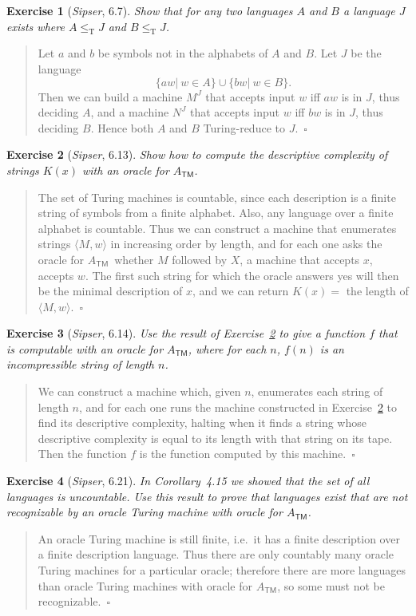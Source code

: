 \documentclass{article}
\theoremstyle{break}			%
\newtheorem{exercise}{Exercise}
\theoremstyle{plain}
\newenvironment{answer}{\begin{quotation}\noindent}{\end{quotation}}
\newcommand{\sipser}{\textit{Sipser}}
\newcommand{\encoding}[1]{\ensuremath{\langle#1\rangle}}
\newcommand{\qed}{~\ensuremath{\square}}
\newcommand{\tred}{\ensuremath{\leq_{\text{T}}}}
\newcommand{\ATM}{\ensuremath{A_{\textsf{TM}}}}
\newcommand{\set}[1]{\ensuremath{\{#1\}}}
\newcommand{\ruleset}[2]{\set{#1|~#2}}
\newcommand{\union}{\ensuremath{\cup}}
\begin{document}
\begin{exercise}[\sipser, 6.7]
Show that for any two languages $A$ and $B$ a language $J$ exists
where $A\tred J$ and $B\tred J$.
\end{exercise}
\begin{answer}
Let $a$ and $b$ be symbols not in the alphabets of $A$ and $B$.  Let
$J$ be the language
\begin{displaymath}
\ruleset{aw}{w\in A} \union \ruleset{bw}{w\in B}.
\end{displaymath}
Then we can build a machine $M^J$ that accepts input $w$ iff $aw$ is
in $J$, thus deciding $A$, and a machine $N^J$ that accepts input $w$
iff $bw$ is in $J$, thus deciding $B$.  Hence both $A$ and $B$
Turing-reduce to $J$.\qed
\end{answer}

\pagebreak
\begin{exercise}[\sipser, 6.13]\label{desc}
Show how to compute the descriptive complexity of strings $K(x)$ with
an oracle for \ATM.
\end{exercise}
\begin{answer}
The set of Turing machines is countable, since each description is a
finite string of symbols from a finite alphabet.  Also, any language
over a finite alphabet is countable.  Thus we can construct a machine
that enumerates strings \encoding{M,w} in increasing order by length,
and for each one asks the oracle for \ATM\ whether $M$ followed by
$X$, a machine that accepts $x$, accepts $w$.  The first such string
for which the oracle answers yes will then be the minimal description
of $x$, and we can return $K(x)=$ the length of \encoding{M,w}.\qed
\end{answer}

\begin{exercise}[\sipser, 6.14]
Use the result of Exercise~\ref{desc} to give a function $f$ that is
computable with an oracle for \ATM, where for each $n$, $f(n)$ is an
incompressible string of length $n$.
\end{exercise}
\begin{answer}
We can construct a machine which, given $n$, enumerates each string of
length $n$, and for each one runs the machine constructed in
Exercise~\ref{desc} to find its descriptive complexity, halting when
it finds a string whose descriptive complexity is equal to its length
with that string on its tape.  Then the function $f$ is the function
computed by this machine.\qed
\end{answer}

\begin{exercise}[\sipser, 6.21]
In Corollary~4.15 we showed that the set of all languages is
uncountable.  Use this result to prove that languages exist that are
not recognizable by an oracle Turing machine with oracle for \ATM.
\end{exercise}
\begin{answer}
An oracle Turing machine is still finite, i.e.~it has a finite
description over a finite description language.  Thus there are only
countably many oracle Turing machines for a particular oracle;
therefore there are more languages than oracle Turing machines with
oracle for \ATM, so some must not be recognizable.\qed
\end{answer}
\end{document}
